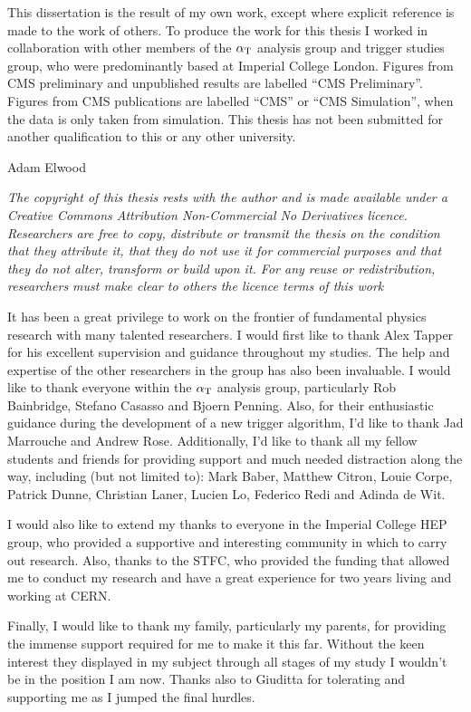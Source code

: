 \begin{declaration}
  This dissertation is the result of my own work, except where
  explicit reference is made to the work of others. To produce the
  work for this thesis I worked in collaboration with other members of
  the $\alpha_{\text{T}}$ analysis group and trigger studies group, who were
  predominantly based at Imperial College London. Figures from CMS
  preliminary and unpublished results are labelled ``CMS
  Preliminary''. Figures from CMS publications are labelled ``CMS'' or
  ``CMS Simulation'', when the data is only taken from simulation. This
  thesis has not been submitted for another qualification to this or
  any other university. 
  \vspace*{1cm}
  \begin{flushright}
    Adam Elwood
  \end{flushright}
  \vspace*{1cm}
  {\it The copyright of this thesis rests with the author and is made
  available under a Creative Commons Attribution Non-Commercial No
  Derivatives licence. Researchers are free to copy, distribute or
  transmit the thesis on the condition that they attribute it, that
  they do
  not use it for commercial purposes and that they do not alter,
  transform or build upon it. For any reuse or redistribution,
  researchers must make clear to others the licence terms of this
  work}
\end{declaration}


\begin{acknowledgements}
It has been a great privilege to work on the frontier of fundamental
physics research with many talented researchers. I would first like to
thank Alex Tapper for his excellent supervision and guidance
throughout my studies. The help and expertise of the
other researchers in the group has also been invaluable. I would like to
thank everyone within the $\alpha_{\text{T}}$ analysis group, particularly Rob
Bainbridge, Stefano Casasso and Bjoern Penning. Also, for their enthusiastic
guidance during the development of a new trigger algorithm, I'd like to
thank Jad Marrouche and Andrew Rose. Additionally, I'd like to thank
all my fellow students and friends for providing support and much
needed distraction along the way, including (but not limited to): Mark
Baber, Matthew Citron, Louie Corpe, Patrick Dunne, Christian Laner,
Lucien Lo, Federico Redi and Adinda de Wit.

I would also like to extend my thanks to everyone in the Imperial
College HEP group, who provided a supportive and interesting community
in which to carry out research. Also, thanks to the STFC,
who provided the funding that allowed me to conduct my research and
have a great experience for two years living and working at CERN.

Finally, I would like to thank my family, particularly my parents, for
providing the immense support required for me to make it this far.
Without the keen interest they displayed in my subject through all
stages of my study I wouldn't be in the position I am now. Thanks
also to Giuditta for tolerating and supporting me as I jumped the
final hurdles.
\end{acknowledgements}


